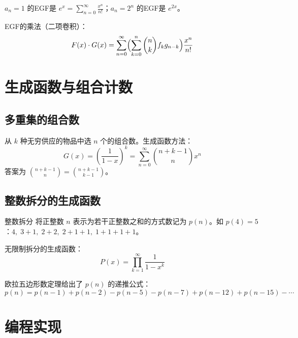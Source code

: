 \begin{example}
\(a_n=1\) 的EGF是 \(e^x = \sum_{n=0}^{\infty} \frac{x^n}{n!}\)；\(a_n=2^n\) 的EGF是 \(e^{2x}\)。

EGF的乘法（二项卷积）：
\[
F(x)\cdot G(x) = \sum_{n=0}^{\infty} \Bigl(\sum_{k=0}^{n} \binom{n}{k} f_k g_{n-k}\Bigr) \frac{x^n}{n!}
\]
\end{example}

\section{生成函数与组合计数}

\subsection{多重集的组合数}

从 \(k\) 种无穷供应的物品中选 \(n\) 个的组合数。生成函数方法：
\[
G(x) = \left(\frac{1}{1-x}\right)^k = \sum_{n=0}^{\infty} \binom{n+k-1}{n} x^n
\]
答案为 \(\binom{n+k-1}{n} = \binom{n+k-1}{k-1}\)。

\subsection{整数拆分的生成函数}

\begin{mydefinition}{整数拆分}
将正整数 \(n\) 表示为若干正整数之和的方式数记为 \(p(n)\)。如 \(p(4)=5\)：\(4,\;3+1,\;2+2,\;2+1+1,\;1+1+1+1\)。
\end{mydefinition}

无限制拆分的生成函数：
\[
P(x) = \prod_{k=1}^{\infty} \frac{1}{1-x^k}
\]

欧拉五边形数定理给出了 \(p(n)\) 的递推公式：
\[
p(n) = p(n-1) + p(n-2) - p(n-5) - p(n-7) + p(n-12) + p(n-15) - \cdots
\]

\section{编程实现}

